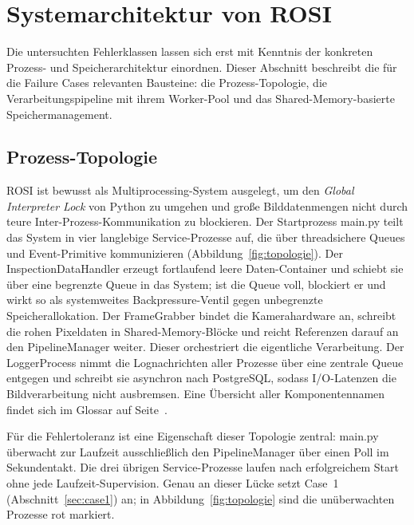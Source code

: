
\section{Systemarchitektur von ROSI}
\label{sec:architektur}

Die untersuchten Fehlerklassen lassen sich erst mit Kenntnis der konkreten Prozess- und
Speicherarchitektur einordnen. Dieser Abschnitt beschreibt die für die Failure Cases
relevanten Bausteine: die Prozess-Topologie, die Verarbeitungspipeline mit ihrem
Worker-Pool und das Shared-Memory-basierte Speichermanagement.

\subsection{Prozess-Topologie}
\label{sec:architektur-topologie}

ROSI ist bewusst als Multiprocessing-System ausgelegt, um den \textit{Global Interpreter
Lock} von Python zu umgehen und große Bilddatenmengen nicht durch teure
Inter-Prozess-Kommunikation zu blockieren. Der Startprozess main.py teilt das
System in vier langlebige Service-Prozesse auf, die über threadsichere Queues und
Event-Primitive kommunizieren (Abbildung~\ref{fig:topologie}). Der
InspectionDataHandler erzeugt fortlaufend leere Daten-Container und schiebt sie
über eine begrenzte Queue in das System; ist die Queue voll, blockiert er und wirkt so als
systemweites Backpressure-Ventil gegen unbegrenzte Speicherallokation. Der
FrameGrabber bindet die Kamerahardware an, schreibt die rohen Pixeldaten in
Shared-Memory-Blöcke und reicht Referenzen darauf an den PipelineManager weiter.
Dieser orchestriert die eigentliche Verarbeitung. Der LoggerProcess nimmt die
Lognachrichten aller Prozesse über eine zentrale Queue entgegen und schreibt sie
asynchron nach PostgreSQL, sodass I/O-Latenzen die Bildverarbeitung nicht ausbremsen.
Eine Übersicht aller Komponentennamen findet sich im Glossar auf
Seite~\pageref{sec:glossar}.

Für die Fehlertoleranz ist eine Eigenschaft dieser Topologie zentral:
main.py überwacht zur Laufzeit ausschließlich den PipelineManager
über einen Poll im Sekundentakt. Die drei übrigen Service-Prozesse laufen nach
erfolgreichem Start ohne jede Laufzeit-Supervision. Genau an dieser Lücke setzt
Case~1 (Abschnitt~\ref{sec:case1}) an; in Abbildung~\ref{fig:topologie} sind die
unüberwachten Prozesse rot markiert.

